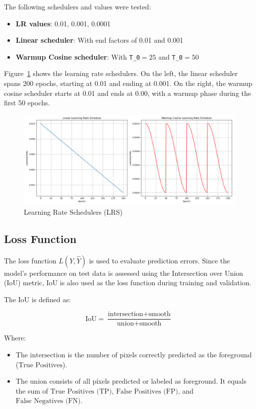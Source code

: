The following schedulers and values were tested:
\begin{itemize}
    \item \textbf{LR values}: 0.01, 0.001, 0.0001
    \item \textbf{Linear scheduler}: With end factors of 0.01 and 0.001
    \item \textbf{Warmup Cosine scheduler}: With \texttt{T\_0}$= 25$ and \texttt{T\_0}$= 50$
\end{itemize}

Figure~\ref{fig:LRS} shows the learning rate schedulers. On the left, the linear scheduler spans 200 epochs, starting at 0.01 and ending at 0.001. On the right, the warmup cosine scheduler starts at 0.01 and ends at 0.00, with a warmup phase during the first 50 epochs.

\begin{figure}[H]
    \centering
    \includegraphics[width=0.9\linewidth]{PICTURES/LRS.png}
    \caption{Learning Rate Schedulers (LRS)}
    \label{fig:LRS}
\end{figure}
\subsection{Loss Function}\label{IoU}

The loss function \( L(Y, \hat{Y}) \) is used to evaluate prediction errors. Since the model's performance on test data is assessed using the Intersection over Union (IoU) metric, IoU is also used as the loss function during training and validation.

The IoU is defined as:

\begin{equation}
\text{IoU} = \frac{\text{intersection} + \text{smooth}}{\text{union} + \text{smooth}}
\label{eq:iou}
\end{equation}


Where:
\begin{itemize}
    \item The \( \text{intersection} \) is the number of pixels correctly predicted as the foreground (\(\text{True Positives}\)).
    \item The \( \text{union} \) consists of all pixels predicted or labeled as foreground. It equals the sum of \( \text{True Positives (TP)} \), \( \text{False Positives (FP)} \), and \( \text{False Negatives (FN)} \).
\end{itemize}

